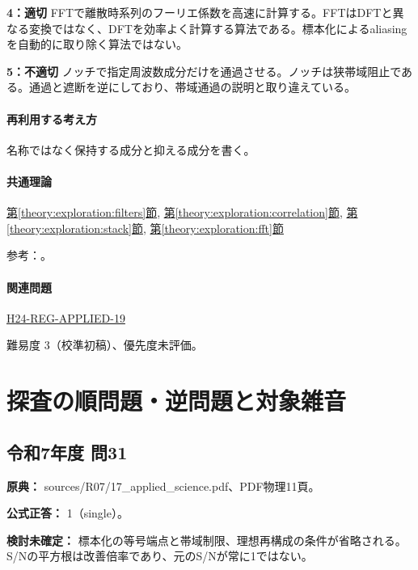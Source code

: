 \noindent\textbf{4：適切} FFTで離散時系列のフーリエ係数を高速に計算する。FFTはDFTと異なる変換ではなく、DFTを効率よく計算する算法である。標本化によるaliasingを自動的に取り除く算法ではない。\par

\noindent\textbf{5：不適切} ノッチで指定周波数成分だけを通過させる。ノッチは狭帯域阻止である。通過と遮断を逆にしており、帯域通過の説明と取り違えている。\par

\paragraph{再利用する考え方} 名称ではなく保持する成分と抑える成分を書く。

\paragraph{共通理論} \hyperref[theory:exploration:filters]{第\ref*{theory:exploration:filters}節}, \hyperref[theory:exploration:correlation]{第\ref*{theory:exploration:correlation}節}, \hyperref[theory:exploration:stack]{第\ref*{theory:exploration:stack}節}, \hyperref[theory:exploration:fft]{第\ref*{theory:exploration:fft}節}

\par 参考：\cite{mit_signals2010,mit_moving2012,scipy_notch,scipy_fft,usgs_processing2000}。

\paragraph{関連問題} \hyperref[q:h24-reg-applied-19]{H24-REG-APPLIED-19}

\par 難易度 3（校準初稿）、優先度未評価。

\section{探査の順問題・逆問題と対象雑音}

\subsection{令和7年度 問31}
\label{q:r07-reg-applied-31}

\noindent\textbf{原典：} sources/R07/17\_applied\_science.pdf、PDF物理11頁。

\textbf{公式正答：} 1（single）。

\par\textbf{検討未確定：} 標本化の等号端点と帯域制限、理想再構成の条件が省略される。S/Nの平方根は改善倍率であり、元のS/Nが常に1ではない。

